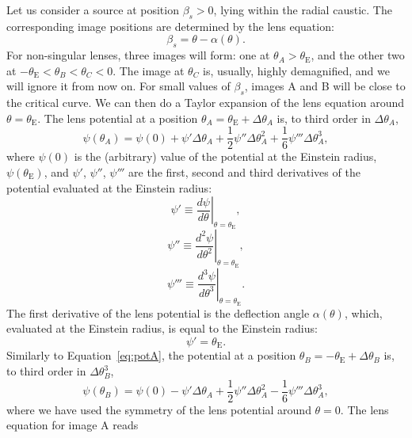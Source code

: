 \documentclass[usenatbib]{mnras}
\def\psio{\psi(0)}
\def\psii{\psi'}
\def\psiii{\psi''}
\def\psiiii{\psi'''}
\def\tein{\theta_{\mathrm{E}}}
\def\Eref#1{Equation~\ref{#1}\xspace}
\begin{document}
Let us consider a source at position $\beta_s>0$, lying within the radial caustic.
The corresponding image positions are determined by the lens equation:
\begin{equation}
\beta_s = \theta  - \alpha(\theta).
\end{equation}
For non-singular lenses, three images will form: one at $\theta_A > \tein$, and the other two at $-\tein < \theta_B < \theta_C < 0$.
The image at $\theta_C$ is, usually, highly demagnified, and we will ignore it from now on.
For small values of $\beta_s$, images A and B will be close to the critical curve. We can then do a Taylor expansion of the lens equation around $\theta=\tein$.
The lens potential at a position $\theta_A = \tein + \Delta\theta_A$ is, to third order in $\Delta\theta_A$,
\begin{equation}\label{eq:potA}
\psi(\theta_A) = \psio + \psii \Delta\theta_A + \frac12 \psiii \Delta\theta_A^2 + \frac16 \psiiii \Delta\theta_A ^ 3,
\end{equation}
where $\psio$ is the (arbitrary) value of the potential at the Einstein radius, $\psi(\tein)$, and $\psii$, $\psiii$, $\psiiii$ are the first, second and third derivatives of the potential evaluated at the Einstein radius:
\begin{equation}
\psii \equiv \left. \frac{d\psi}{d\theta} \right\rvert_{\theta=\tein},
\end{equation}
\begin{equation}
\psiii \equiv \left. \frac{d^2\psi}{d\theta^2} \right\rvert_{\theta=\tein},
\end{equation}
\begin{equation}
\psiiii \equiv \left. \frac{d^3\psi}{d\theta^3} \right\rvert_{\theta=\tein}.
\end{equation}
The first derivative of the lens potential is the deflection angle $\alpha(\theta)$, which, evaluated at the Einstein radius, is equal to the Einstein radius:
\begin{equation}\label{eq:rein}
\psii = \tein.
\end{equation}
Similarly to \Eref{eq:potA}, the potential at a position $\theta_B = -\tein + \Delta\theta_B$ is, to third order in $\Delta\theta_B^3$,
\begin{equation}\label{eq:potB}
\psi(\theta_B) = \psio - \psii \Delta\theta_A + \frac12 \psiii \Delta\theta_A^2 - \frac16 \psiiii \Delta\theta_A ^ 3,
\end{equation}
where we have used the symmetry of the lens potential around $\theta = 0$.
The lens equation for image A reads
\end{document}
